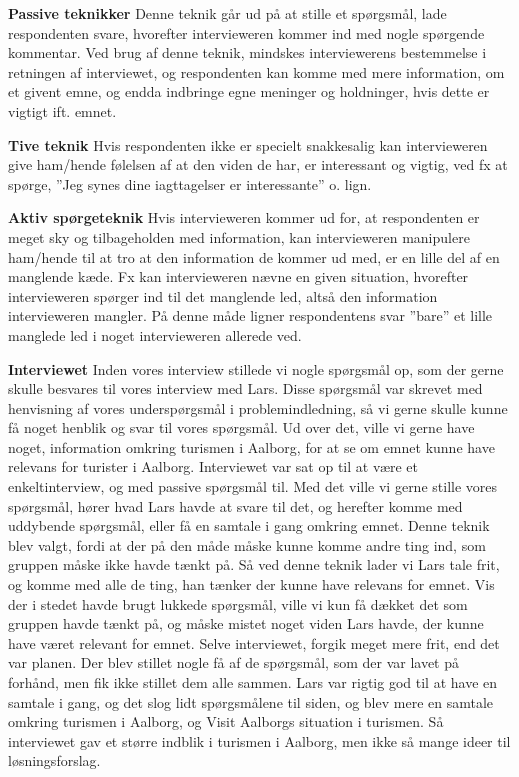 \textbf{Passive teknikker}\newline
Denne teknik går ud på at stille et spørgsmål, lade respondenten svare, hvorefter intervieweren kommer ind med nogle spørgende kommentar. Ved brug af denne teknik, mindskes interviewerens bestemmelse i retningen af interviewet, og respondenten kan komme med mere information, om et givent emne, og endda indbringe egne meninger og holdninger, hvis dette er vigtigt ift. emnet.\newline

\textbf{Tive teknik}\newline
Hvis respondenten ikke er specielt snakkesalig kan intervieweren give ham/hende følelsen af at den viden de har, er interessant og vigtig, ved fx at spørge, ”Jeg synes dine iagttagelser er interessante” o. lign.\newline

\textbf{Aktiv spørgeteknik}\newline
Hvis intervieweren kommer ud for, at respondenten er meget sky og tilbageholden med information, kan intervieweren manipulere ham/hende til at tro at den information de kommer ud med, er en lille del af en manglende kæde. Fx kan intervieweren nævne en given situation, hvorefter intervieweren spørger ind til det manglende led, altså den information intervieweren mangler. På denne måde ligner respondentens svar ”bare” et lille manglede led i noget intervieweren allerede ved.\newline

\textbf{Interviewet}\newline
Inden vores interview stillede vi nogle spørgsmål op, som der gerne skulle besvares til vores interview med Lars. Disse spørgsmål var skrevet med henvisning af vores underspørgsmål i problemindledning, så vi gerne skulle kunne få noget henblik og svar til vores spørgsmål. Ud over det, ville vi gerne have noget, information omkring turismen i Aalborg, for at se om emnet kunne have relevans for turister i Aalborg. 
Interviewet var sat op til at være et enkeltinterview, og med passive spørgsmål til. Med det ville vi gerne stille vores spørgsmål, hører hvad Lars havde at svare til det, og herefter komme med uddybende spørgsmål, eller få en samtale i gang omkring emnet. Denne teknik blev valgt, fordi at der på den måde måske kunne komme andre ting ind, som gruppen måske ikke havde tænkt på. Så ved denne teknik lader vi Lars tale frit, og komme med alle de ting, han tænker der kunne have relevans for emnet. Vis der i stedet havde brugt lukkede spørgsmål, ville vi kun få dækket det som gruppen havde tænkt på, og måske mistet noget viden Lars havde, der kunne have været relevant for emnet. 
Selve interviewet, forgik meget mere frit, end det var planen. Der blev stillet nogle få af de spørgsmål, som der var lavet på forhånd, men fik ikke stillet dem alle sammen. Lars var rigtig god til at have en samtale i gang, og det slog lidt spørgsmålene til siden, og blev mere en samtale omkring turismen i Aalborg, og Visit Aalborgs situation i turismen. Så interviewet gav et større indblik i turismen i Aalborg, men ikke så mange ideer til løsningsforslag.